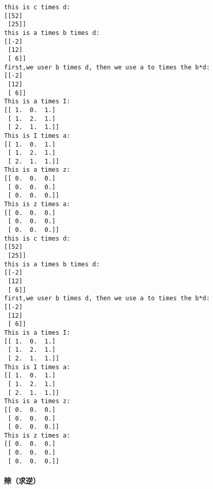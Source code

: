 \documentclass[11pt]{article}
\begin{document}
{    \begin{Verbatim}[commandchars=\\\{\}]
this is c times d:
[[52]
 [25]]
this is a times b times d:
[[-2]
 [12]
 [ 6]]
first,we user b times d, then we use a to times the b*d:
[[-2]
 [12]
 [ 6]]
This is a times I:
[[ 1.  0.  1.]
 [ 1.  2.  1.]
 [ 2.  1.  1.]]
This is I times a:
[[ 1.  0.  1.]
 [ 1.  2.  1.]
 [ 2.  1.  1.]]
This is a times z:
[[ 0.  0.  0.]
 [ 0.  0.  0.]
 [ 0.  0.  0.]]
This is z times a:
[[ 0.  0.  0.]
 [ 0.  0.  0.]
 [ 0.  0.  0.]]
this is c times d:
[[52]
 [25]]
this is a times b times d:
[[-2]
 [12]
 [ 6]]
first,we user b times d, then we use a to times the b*d:
[[-2]
 [12]
 [ 6]]
This is a times I:
[[ 1.  0.  1.]
 [ 1.  2.  1.]
 [ 2.  1.  1.]]
This is I times a:
[[ 1.  0.  1.]
 [ 1.  2.  1.]
 [ 2.  1.  1.]]
This is a times z:
[[ 0.  0.  0.]
 [ 0.  0.  0.]
 [ 0.  0.  0.]]
This is z times a:
[[ 0.  0.  0.]
 [ 0.  0.  0.]
 [ 0.  0.  0.]]

    \end{Verbatim}

    \hypertarget{ux9664ux6c42ux9006}{%
\paragraph{\texorpdfstring{\sout{除}（求逆）}{除（求逆）}}\label{ux9664ux6c42ux9006}}


}
\end{document}
